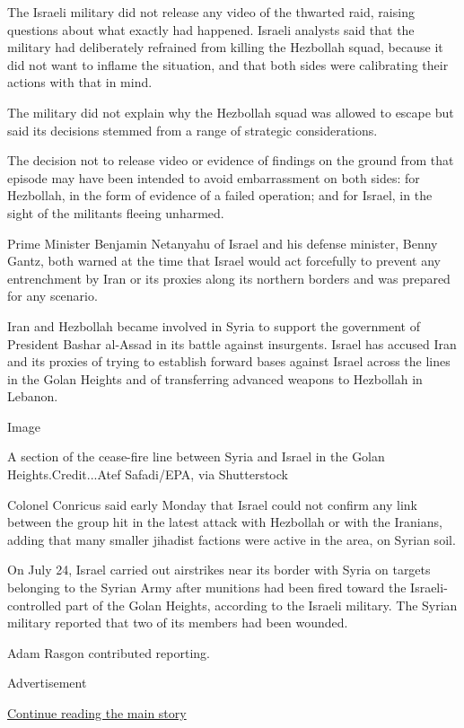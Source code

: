 The Israeli military did not release any video of the thwarted raid,
raising questions about what exactly had happened. Israeli analysts said
that the military had deliberately refrained from killing the Hezbollah
squad, because it did not want to inflame the situation, and that both
sides were calibrating their actions with that in mind.

The military did not explain why the Hezbollah squad was allowed to
escape but said its decisions stemmed from a range of strategic
considerations.

The decision not to release video or evidence of findings on the ground
from that episode may have been intended to avoid embarrassment on both
sides: for Hezbollah, in the form of evidence of a failed operation; and
for Israel, in the sight of the militants fleeing unharmed.

Prime Minister Benjamin Netanyahu of Israel and his defense minister,
Benny Gantz, both warned at the time that Israel would act forcefully to
prevent any entrenchment by Iran or its proxies along its northern
borders and was prepared for any scenario.

Iran and Hezbollah became involved in Syria to support the government of
President Bashar al-Assad in its battle against insurgents. Israel has
accused Iran and its proxies of trying to establish forward bases
against Israel across the lines in the Golan Heights and of transferring
advanced weapons to Hezbollah in Lebanon.

Image

A section of the cease-fire line between Syria and Israel in the Golan
Heights.Credit...Atef Safadi/EPA, via Shutterstock

Colonel Conricus said early Monday that Israel could not confirm any
link between the group hit in the latest attack with Hezbollah or with
the Iranians, adding that many smaller jihadist factions were active in
the area, on Syrian soil.

On July 24, Israel carried out airstrikes near its border with Syria on
targets belonging to the Syrian Army after munitions had been fired
toward the Israeli-controlled part of the Golan Heights, according to
the Israeli military. The Syrian military reported that two of its
members had been wounded.

Adam Rasgon contributed reporting.

Advertisement

\protect\hyperlink{after-bottom}{Continue reading the main story}

